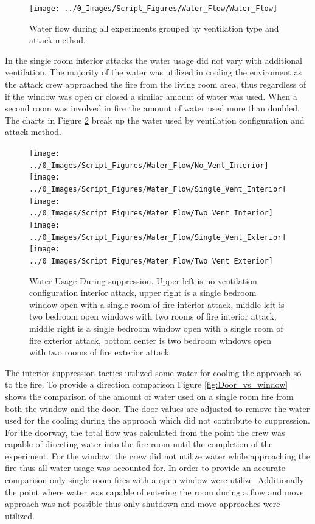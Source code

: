 \documentclass[12pt,oneside]{book}
\begin{document}
\begin{figure}[H]
\centering
\texttt{[image: ../0\_Images/Script\_Figures/Water\_Flow/Water\_Flow]}
\caption[Water Floor All Experiments]{Water flow during all experiments grouped by ventilation type and attack method.}
\label{fig:water_flow_all}
\end{figure}

In the single room interior attacks the water usage did not vary with additional ventilation. The majority of the water was utilized in cooling the enviroment as the attack crew approached the fire from the living room area, thus regardless of if the window was open or closed a similar amount of water was used. When a second room was involved in fire the amount of water used more than doubled. The charts in Figure \ref{fig:water_flow_vent_compare} break up the water used by ventilation configuration and attack method.  

\begin{figure}[H]
\centering
\texttt{[image: ../0\_Images/Script\_Figures/Water\_Flow/No\_Vent\_Interior]}
\texttt{[image: ../0\_Images/Script\_Figures/Water\_Flow/Single\_Vent\_Interior]}
\texttt{[image: ../0\_Images/Script\_Figures/Water\_Flow/Two\_Vent\_Interior]}
\texttt{[image: ../0\_Images/Script\_Figures/Water\_Flow/Single\_Vent\_Exterior]}
\texttt{[image: ../0\_Images/Script\_Figures/Water\_Flow/Two\_Vent\_Exterior]}
\caption[Water Usage vs. Ventilation]{Water Usage During suppression. Upper left is no ventilation configuration interior attack, upper right is a single bedroom window open with a single room of fire interior attack, middle left is two bedroom open windows with two rooms of fire interior attack, middle right is a single bedroom window open with a single room of fire exterior attack, bottom center is two bedroom windows open with two rooms of fire exterior attack}
\label{fig:water_flow_vent_compare}
\end{figure}

The interior suppression tactics utilized some water for cooling the approach so to the fire. To provide a direction comparison Figure \ref{fig:Door_vs_window} shows the comparison of the amount of water used on a single room fire from both the window and the door. The door values are adjusted to remove the water used for the cooling during the approach which did not contribute to suppression. For the doorway, the total flow was calculated from the point the crew was capable of directing water into the fire room until the completion of the experiment. For the window, the crew did not utilize water while approaching the fire thus all water usage was accounted for. In order to provide an accurate comparison only single room fires with a open window were utilize. Additionally the point where water was capable of entering the room during a flow and move approach was not possible thus only shutdown and move approaches were utilized.
\end{document}

